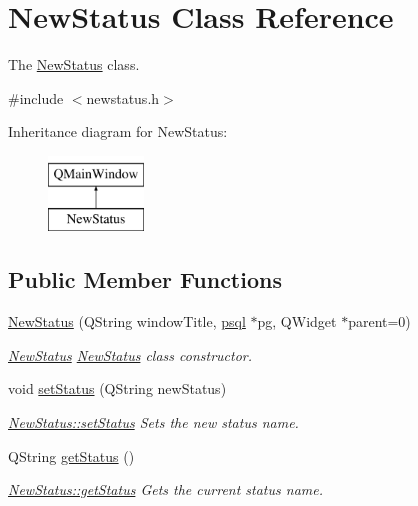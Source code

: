 \hypertarget{class_new_status}{}\section{New\+Status Class Reference}
\label{class_new_status}


The \mbox{\hyperlink{class_new_status}{New\+Status}} class.  




{\ttfamily \#include $<$newstatus.\+h$>$}

Inheritance diagram for New\+Status\+:\begin{figure}[H]
\begin{center}
\leavevmode
\includegraphics[height=2.000000cm]{class_new_status}
\end{center}
\end{figure}
\subsection*{Public Member Functions}
\begin{DoxyCompactItemize}
\item 
\mbox{\hyperlink{class_new_status_a5a09743191f617f006bc89e4b35984bf}{New\+Status}} (Q\+String window\+Title, \mbox{\hyperlink{classpsql}{psql}} $\ast$pg, Q\+Widget $\ast$parent=0)
\begin{DoxyCompactList}\small\item\em \mbox{\hyperlink{class_new_status}{New\+Status}} \mbox{\hyperlink{class_new_status}{New\+Status}} class constructor. \end{DoxyCompactList}\item 
void \mbox{\hyperlink{class_new_status_a861326c3b5c45040b933e4e65a4646e2}{set\+Status}} (Q\+String new\+Status)
\begin{DoxyCompactList}\small\item\em \mbox{\hyperlink{class_new_status_a861326c3b5c45040b933e4e65a4646e2}{New\+Status\+::set\+Status}} Sets the new status name. \end{DoxyCompactList}\item 
Q\+String \mbox{\hyperlink{class_new_status_a7ea744ad1645c5954000983d50947154}{get\+Status}} ()
\begin{DoxyCompactList}\small\item\em \mbox{\hyperlink{class_new_status_a7ea744ad1645c5954000983d50947154}{New\+Status\+::get\+Status}} Gets the current status name. \end{DoxyCompactList}\end{DoxyCompactItemize}


